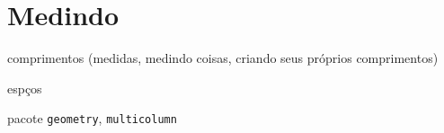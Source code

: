 \section{Medindo}

comprimentos  (medidas, medindo coisas, criando seus próprios
comprimentos)

espços

pacote \verb!geometry!, \verb!multicolumn!
